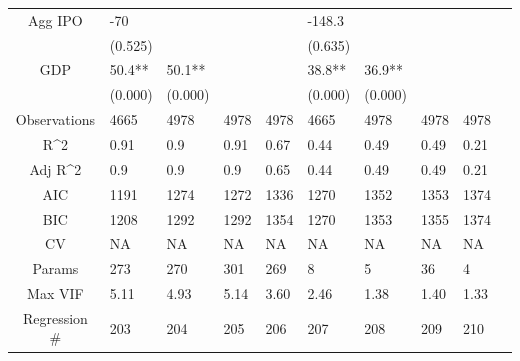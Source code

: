 \documentclass{article}
\begin{document}
\begin{table}[H]
\begin{tabular}{|clllllllll|}
  Agg IPO & -70 &  &  &  & -148.3 &  &  &  & \\
   & (0.525) &  &  &  & (0.635) &  &  &  & \\
  GDP & 50.4** & 50.1** &  &  & 38.8** & 36.9** &  &  & \\
   & (0.000) & (0.000) &  &  & (0.000) & (0.000) &  &  & \\
  \hline
 Observations & 4665 & 4978 & 4978 & 4978 & 4665 & 4978 & 4978 & 4978 & \\
  R^2 & 0.91 & 0.9 & 0.91 & 0.67 & 0.44 & 0.49 & 0.49 & 0.21 & \\
  Adj R^2 & 0.9 & 0.9 & 0.9 & 0.65 & 0.44 & 0.49 & 0.49 & 0.21 & \\
  AIC & 1191 & 1274 & 1272 & 1336 & 1270 & 1352 & 1353 & 1374 & \\
  BIC & 1208 & 1292 & 1292 & 1354 & 1270 & 1353 & 1355 & 1374 & \\
  CV & NA & NA & NA & NA & NA & NA & NA & NA & \\
  Params & 273 & 270 & 301 & 269 & 8 & 5 & 36 & 4 & \\
  Max VIF & 5.11 & 4.93 & 5.14 & 3.60 & 2.46 & 1.38 & 1.40 & 1.33 & \\
  Regression \# & 203 & 204 & 205 & 206 & 207 & 208 & 209 & 210 & \\
   \hline
\end{tabular}

\end{table}
\end{document}
